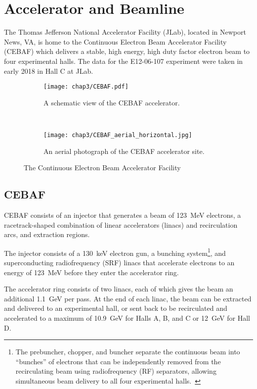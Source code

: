 \section{Accelerator and Beamline}
The Thomas Jefferson National Accelerator Facility (JLab), located in
Newport News, VA, is home to the Continuous Electron Beam Accelerator Facility
(CEBAF) which delivers a stable, high energy, high duty factor electron beam
to four experimental halls.
The data for the E12-06-107 experiment were taken in early 2018 in Hall C at
JLab.

\begin{figure}[ht]
    \centering
    \begin{subfigure}[b]{0.9\textwidth}
        \centering
        \texttt{[image: chap3/CEBAF.pdf]}
        \caption{A schematic view of the CEBAF accelerator.}
        \label{fig:CEBAF_cartoon}
    \end{subfigure}
    \vspace{0.1cm}
    \\
    \begin{subfigure}[b]{0.9\textwidth}
        \centering
        \texttt{[image: chap3/CEBAF\_aerial\_horizontal.jpg]}
        \caption{An aerial photograph of the CEBAF accelerator site.}
        \label{fig:CEBAF_aerial}
    \end{subfigure}
    \caption{The Continuous Electron Beam Accelerator Facility}
    \label{fig:CEBAF}
\end{figure}


\subsection{CEBAF}
CEBAF consists of an injector that generates a beam of \SI{123}{MeV} electrons,
a racetrack-shaped combination of linear accelerators (linacs) and
recirculation arcs, and extraction regions.


The injector consists of a \SI{130}{keV} electron gun, a bunching
system\footnote{The prebuncher, chopper, and buncher separate the continuous
beam into ``bunches'' of electrons that can be independently removed from the
recirculating beam using radiofrequency (RF) separators, allowing simultaneous
beam delivery to all four experimental halls.~\cite{Kazimi_2019}}, and
superconducting radiofrequency (SRF) linacs that accelerate electrons to
an energy of \SI{123}{MeV} before they enter the accelerator ring.


The accelerator ring consists of two linacs, each of which gives
the beam an additional \SI{1.1}{GeV} per pass.
At the end of each linac, the beam can be extracted and delivered to an
experimental hall, or sent back to be recirculated and accelerated to a maximum
of \SI{10.9}{GeV} for Halls A, B, and C or \SI{12}{GeV} for Hall D.


